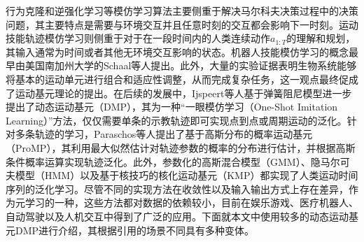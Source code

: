行为克隆和逆强化学习等模仿学习算法主要侧重于解决马尔科夫决策过程中的决策问题，其主要特点是需要与环境交互并且任意时刻的交互都会影响下一时刻。运动技能轨迹模仿学习则侧重于对于在一段时间内的人类连续动作$a_{1:T}$的理解和规划，其输入通常为时间或者其他无环境交互影响的状态\cite{HuangJiQiRenYunDongGuiJiDeMoFangXueXiZongShu}。机器人技能模仿学习的概念最早由美国南加州大学的Schaal等人\cite{schaalImitationLearningRoute1999}提出。此外，大量的实验证据表明生物系统能够将基本的运动单元进行组合和适应性调整，从而完成复杂任务，这一观点最终促成了运动基元理论的提出\cite{saverianoDynamicMovementPrimitives2023}。在后续的发展中，Ijspeert等人\cite{ijspeertDynamicalMovementPrimitives2013,righettiDynamicHebbianLearning2006}基于弹簧阻尼模型进一步提出了动态运动基元（DMP），其为一种``一眼模仿学习（One-Shot Imitation Learning）''方法，仅仅需要单条的示教轨迹即可实现点到点或周期运动的泛化。针对多条轨迹的学习，Paraschos等人提出了基于高斯分布的概率运动基元（ProMP），其利用最大似然估计对轨迹参数的概率的分布进行估计，并根据高斯条件概率运算实现轨迹泛化。此外，参数化的高斯混合模型（GMM）\cite{paraschosProbabilisticMovementPrimitives2013}、隐马尔可夫模型（HMM）\cite{rabinerIntroductionHiddenMarkov1986}以及基于核技巧的核化运动基元（KMP）\cite{huangKernelizedMovementPrimitives2019}都实现了人类运动时间序列的泛化学习。尽管不同的实现方法在收敛性以及输入输出方式上存在差异，作为元学习的一种，这些方法都对数据的依赖较小，目前在娱乐游戏、医疗机器人、自动驾驶以及人机交互中得到了广泛的应用。下面就本文中使用较多的动态运动基元DMP进行介绍，其根据引用的场景不同具有多种变体。

